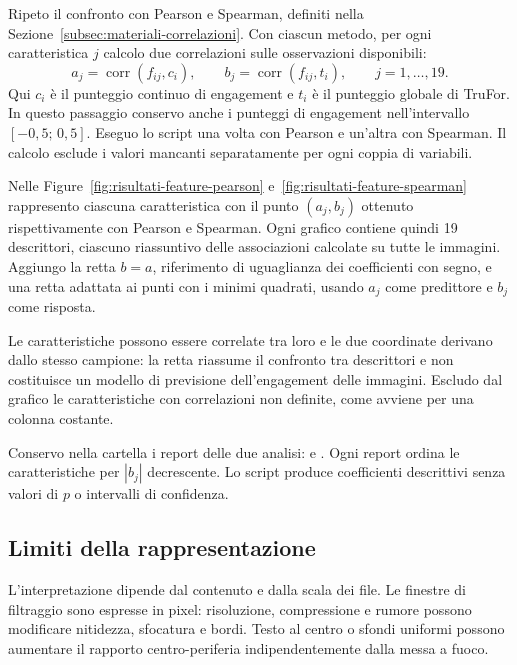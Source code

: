 Ripeto il confronto con Pearson e Spearman, definiti nella Sezione~\ref{subsec:materiali-correlazioni}. Con ciascun metodo, per ogni caratteristica $j$ calcolo due correlazioni sulle osservazioni disponibili:
\begin{equation}
    a_j=\operatorname{corr}(f_{ij},c_i),
    \qquad
    b_j=\operatorname{corr}(f_{ij},t_i),
    \qquad j=1,\ldots,19.
    \label{eq:feature-correlazioni}
\end{equation}
Qui $c_i$ è il punteggio continuo di engagement e $t_i$ è il punteggio globale di TruFor. In questo passaggio conservo anche i punteggi di engagement nell'intervallo $[-0{,}5;\,0{,}5]$. Eseguo lo script una volta con Pearson e un'altra con Spearman. Il calcolo esclude i valori mancanti separatamente per ogni coppia di variabili.

Nelle Figure~\ref{fig:risultati-feature-pearson} e~\ref{fig:risultati-feature-spearman} rappresento ciascuna caratteristica con il punto $(a_j,b_j)$ ottenuto rispettivamente con Pearson e Spearman. Ogni grafico contiene quindi 19 descrittori, ciascuno riassuntivo delle associazioni calcolate su tutte le immagini. Aggiungo la retta $b=a$, riferimento di uguaglianza dei coefficienti con segno, e una retta adattata ai punti con i minimi quadrati, usando $a_j$ come predittore e $b_j$ come risposta.

Le caratteristiche possono essere correlate tra loro e le due coordinate derivano dallo stesso campione: la retta riassume il confronto tra descrittori e non costituisce un modello di previsione dell'engagement delle immagini. Escludo dal grafico le caratteristiche con correlazioni non definite, come avviene per una colonna costante.

Conservo nella cartella  i report delle due analisi:  e . Ogni report ordina le caratteristiche per $|b_j|$ decrescente. Lo script produce coefficienti descrittivi senza valori di $p$ o intervalli di confidenza.

\subsection{Limiti della rappresentazione}
\label{subsec:metodi-feature-limiti}

L'interpretazione dipende dal contenuto e dalla scala dei file. Le finestre di filtraggio sono espresse in pixel: risoluzione, compressione e rumore possono modificare nitidezza, sfocatura e bordi. Testo al centro o sfondi uniformi possono aumentare il rapporto centro-periferia indipendentemente dalla messa a fuoco.

